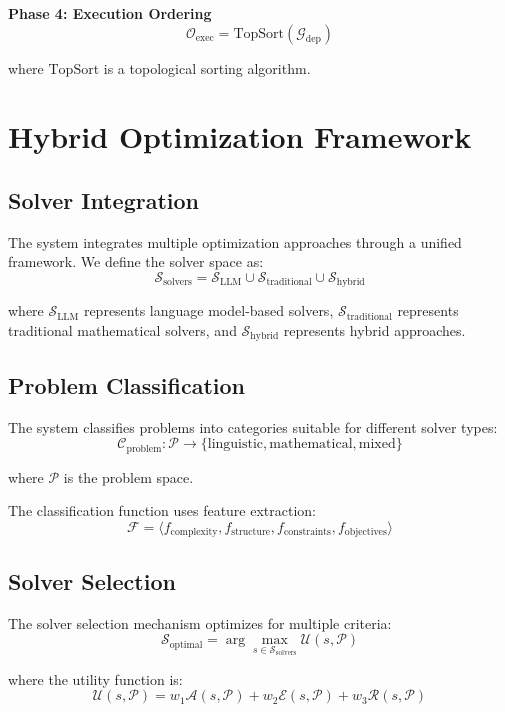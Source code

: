 \documentclass[12pt,a4paper]{article}
\begin{document}
\textbf{Phase 4: Execution Ordering}
$$\mathcal{O}_{\text{exec}} = \text{TopSort}(\mathcal{G}_{\text{dep}})$$

where $\text{TopSort}$ is a topological sorting algorithm.

\section{Hybrid Optimization Framework}

\subsection{Solver Integration}

The system integrates multiple optimization approaches through a unified framework. We define the solver space as:
$$\mathcal{S}_{\text{solvers}} = \mathcal{S}_{\text{LLM}} \cup \mathcal{S}_{\text{traditional}} \cup \mathcal{S}_{\text{hybrid}}$$

where $\mathcal{S}_{\text{LLM}}$ represents language model-based solvers, $\mathcal{S}_{\text{traditional}}$ represents traditional mathematical solvers, and $\mathcal{S}_{\text{hybrid}}$ represents hybrid approaches.

\subsection{Problem Classification}

The system classifies problems into categories suitable for different solver types:
$$\mathcal{C}_{\text{problem}}: \mathcal{P} \rightarrow \{\text{linguistic}, \text{mathematical}, \text{mixed}\}$$

where $\mathcal{P}$ is the problem space.

The classification function uses feature extraction:
$$\mathcal{F} = \langle f_{\text{complexity}}, f_{\text{structure}}, f_{\text{constraints}}, f_{\text{objectives}} \rangle$$

\subsection{Solver Selection}

The solver selection mechanism optimizes for multiple criteria:
$$\mathcal{S}_{\text{optimal}} = \arg\max_{s \in \mathcal{S}_{\text{solvers}}} \mathcal{U}(s, \mathcal{P})$$

where the utility function is:
$$\mathcal{U}(s, \mathcal{P}) = w_1 \mathcal{A}(s, \mathcal{P}) + w_2 \mathcal{E}(s, \mathcal{P}) + w_3 \mathcal{R}(s, \mathcal{P})$$
\end{document}
